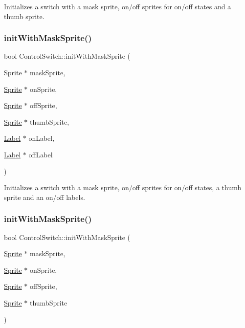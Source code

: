 Initializes a switch with a mask sprite, on/off sprites for on/off states and a thumb sprite. \mbox{\label{classControlSwitch_adea9bc3322f3cc28ea660cb5d4b02b65}} 
\subsubsection{\texorpdfstring{init\+With\+Mask\+Sprite()}{initWithMaskSprite()}\hspace{0.1cm}{\footnotesize\ttfamily [2/4]}}
{\footnotesize\ttfamily bool Control\+Switch\+::init\+With\+Mask\+Sprite (\begin{DoxyParamCaption}\item[{\hyperlink{classSprite}{Sprite} $\ast$}]{mask\+Sprite,  }\item[{\hyperlink{classSprite}{Sprite} $\ast$}]{on\+Sprite,  }\item[{\hyperlink{classSprite}{Sprite} $\ast$}]{off\+Sprite,  }\item[{\hyperlink{classSprite}{Sprite} $\ast$}]{thumb\+Sprite,  }\item[{\hyperlink{classLabel}{Label} $\ast$}]{on\+Label,  }\item[{\hyperlink{classLabel}{Label} $\ast$}]{off\+Label }\end{DoxyParamCaption})}

Initializes a switch with a mask sprite, on/off sprites for on/off states, a thumb sprite and an on/off labels. \mbox{\label{classControlSwitch_a3b67353d399371a96cd4231ba274ff0e}} 
\subsubsection{\texorpdfstring{init\+With\+Mask\+Sprite()}{initWithMaskSprite()}\hspace{0.1cm}{\footnotesize\ttfamily [3/4]}}
{\footnotesize\ttfamily bool Control\+Switch\+::init\+With\+Mask\+Sprite (\begin{DoxyParamCaption}\item[{\hyperlink{classSprite}{Sprite} $\ast$}]{mask\+Sprite,  }\item[{\hyperlink{classSprite}{Sprite} $\ast$}]{on\+Sprite,  }\item[{\hyperlink{classSprite}{Sprite} $\ast$}]{off\+Sprite,  }\item[{\hyperlink{classSprite}{Sprite} $\ast$}]{thumb\+Sprite }\end{DoxyParamCaption})}

